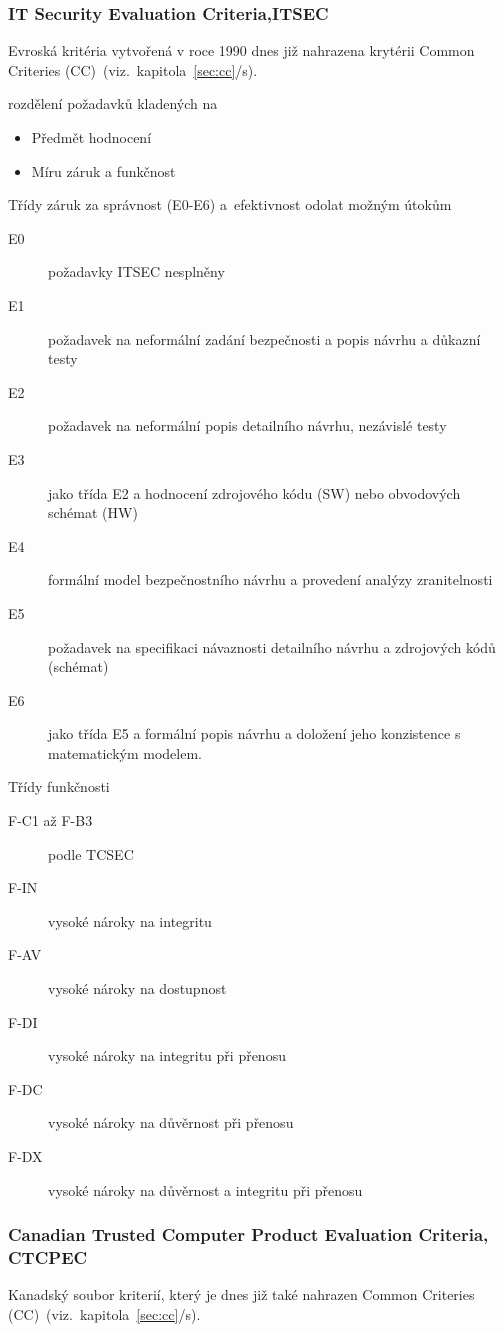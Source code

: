 \documentclass[a4paper,12pt]{article}
\newcommand{\odkazNaKapitolu}[1]{(viz.~kapitola~\ref{#1}/s\pageref{#1})}
\begin{document}
\subsubsection{IT Security Evaluation Criteria,ITSEC}\label{sec:ITSEC}
Evroská kritéria vytvořená v roce 1990 dnes již nahrazena krytérii Common Criteries (CC)~\odkazNaKapitolu{sec:cc}.

rozdělení požadavků kladených na
\begin{itemize}
 \item Předmět hodnocení
 \item Míru záruk a funkčnost
\end{itemize}
Třídy záruk za správnost (E0-E6) a~efektivnost odolat možným útokům~\cite{PrezentaceBIS}
\begin{description}
 \item[E0] požadavky ITSEC nesplněny
 \item[E1] požadavek na neformální zadání bezpečnosti a popis návrhu a důkazní testy
 \item[E2] požadavek na neformální popis detailního návrhu, nezávislé testy
 \item[E3] jako třída E2 a hodnocení zdrojového kódu (SW) nebo obvodových schémat (HW)
 \item[E4] formální model bezpečnostního návrhu a provedení analýzy zranitelnosti
 \item[E5] požadavek na specifikaci návaznosti detailního návrhu a zdrojových kódů (schémat)
 \item[E6] jako třída E5 a formální popis návrhu a doložení jeho konzistence s matematickým modelem. 
\end{description}

Třídy funkčnosti~\cite{PrezentaceBIS}
\begin{description}
\item[F-C1 až F-B3] podle TCSEC 
\item[F-IN] vysoké nároky na integritu
\item[F-AV] vysoké nároky na dostupnost
\item[F-DI] vysoké nároky na integritu při přenosu
\item[F-DC] vysoké nároky na důvěrnost při přenosu
\item[F-DX] vysoké nároky na důvěrnost a integritu při přenosu
\end{description}

\subsubsection{Canadian Trusted Computer Product Evaluation Criteria, CTCPEC}\label{sec:CTCPEC}
Kanadský soubor kriterií, který je dnes již také nahrazen Common Criteries (CC)~\odkazNaKapitolu{sec:cc}.\\
\end{document}
